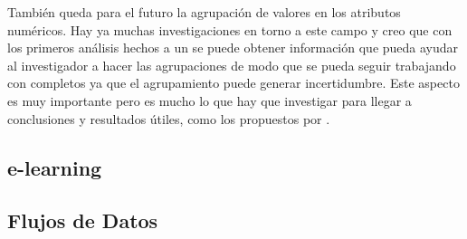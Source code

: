 También queda para el futuro la agrupación de valores en los atributos numéricos. Hay ya muchas investigaciones en torno a este campo y creo que con los primeros análisis hechos a un \dataset se puede obtener información que pueda ayudar al investigador a hacer las agrupaciones de modo que se pueda seguir trabajando con \catalogos completos ya que el agrupamiento puede generar incertidumbre. Este aspecto es muy importante pero es mucho lo que hay que investigar para llegar a conclusiones y resultados útiles, como los propuestos por \citet{DeshpandeKarypis-UsingConjunctionofAttributeValuesforClassification-2002}.




\subsection{e-learning}
\label{sec:clasificacion:e-learning}





\subsection{Flujos de Datos}
\label{sec:clasificacion:flujos-de-datos}


